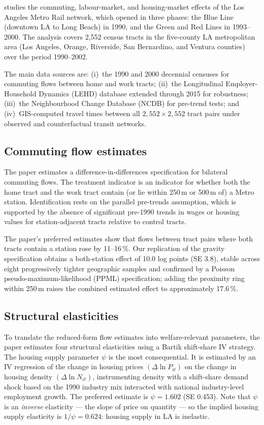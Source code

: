 \documentclass[12pt,a4paper]{article}
\begin{document}
\citet{severen2021} studies the commuting, labour-market, and housing-market
effects of the Los Angeles Metro Rail network, which opened in three phases: the
Blue Line (downtown LA to Long Beach) in 1990, and the Green and Red Lines in
1993--2000.  The analysis covers 2,552 census tracts in the five-county LA
metropolitan area (Los Angeles, Orange, Riverside, San Bernardino, and Ventura
counties) over the period 1990--2002.

The main data sources are: (i)~the 1990 and 2000 decennial censuses for
commuting flows between home and work tracts; (ii)~the Longitudinal
Employer-Household Dynamics (LEHD) database extended through 2015 for
robustness; (iii)~the Neighbourhood Change Database (NCDB) for pre-trend tests;
and (iv)~GIS-computed travel times between all $2{,}552\times2{,}552$ tract
pairs under observed and counterfactual transit networks.

\subsection{Commuting flow estimates}

The paper estimates a difference-in-differences specification for bilateral
commuting flows.  The treatment indicator is an indicator for whether both the
home tract and the work tract contain (or lie within 250\,m or 500\,m of) a
Metro station.  Identification rests on the parallel pre-trends assumption, which
is supported by the absence of significant pre-1990 trends in wages or housing
values for station-adjacent tracts relative to control tracts.

The paper's preferred estimates show that flows between tract pairs where both
tracts contain a station rose by 11--16\,\%.  Our replication of the gravity
specification obtains a both-station effect of 10.0 log points (SE 3.8), stable
across eight progressively tighter geographic samples and confirmed by a Poisson
pseudo-maximum-likelihood (PPML) specification; adding the proximity ring within
250\,m raises the combined estimated effect to approximately 17.6\,\%.

\subsection{Structural elasticities}

To translate the reduced-form flow estimates into welfare-relevant parameters,
the paper estimates four structural elasticities using a Bartik shift-share IV
strategy.  The housing supply parameter $\psi$ is the most consequential.  It is
estimated by an IV regression of the change in housing prices
$(\Delta\ln P_{it})$ on the change in housing density $(\Delta\ln N_{it})$,
instrumenting density with a shift-share demand shock based on the 1990 industry
mix interacted with national industry-level employment growth.  The preferred
estimate is $\psi = 1.602$ (SE 0.453).  Note that $\psi$ is an \emph{inverse}
elasticity --- the slope of price on quantity --- so the implied housing supply
elasticity is $1/\psi = 0.624$: housing supply in LA is inelastic.
\end{document}
